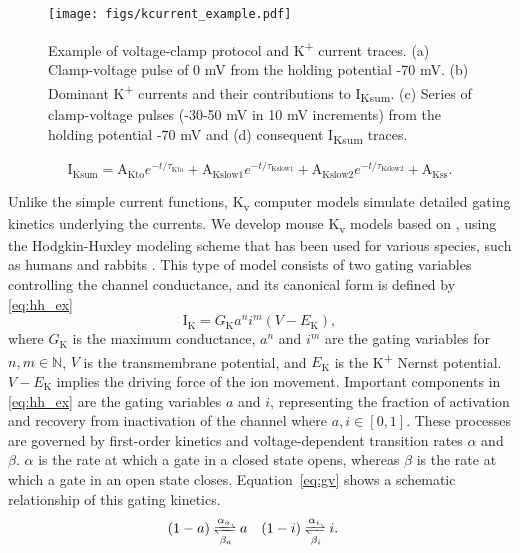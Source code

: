 \documentclass[11pt]{article}
\begin{document}
\begin{figure}[!ht]
    \centering
    \texttt{[image: figs/kcurrent\_example.pdf]}
    \caption{Example of voltage-clamp protocol and K\textsuperscript{+} current traces. (a) Clamp-voltage pulse of 0 mV from the holding potential -70 mV. (b) Dominant K\textsuperscript{+} currents and their contributions to I\textsubscript{Ksum}. (c) Series of clamp-voltage pulses (-30-50 mV in 10 mV increments) from the holding potential -70 mV and (d) consequent I\textsubscript{Ksum} traces.}
    \label{fig:kcurrent_example}
\end{figure}
\begin{equation}
    \label{eq:expl_fitting}
    \mathrm{I}_{\mathrm{Ksum}} = \mathrm{A}_{\mathrm{Kto}}e^{-t/\tau_{\mathrm{Kto}}} + \mathrm{A}_{\mathrm{Kslow1}}e^{-t/\tau_{\mathrm{Kslow1}}} + \mathrm{A}_{\mathrm{Kslow2}}e^{-t/\tau_{\mathrm{Kslow2}}} +  \mathrm{A}_{\mathrm{Kss}}.   
\end{equation}

Unlike the simple current functions, K\textsubscript{v} computer models simulate detailed gating kinetics underlying the currents. We develop mouse K\textsubscript{v} models based on \citep{bondarenko2014compartmentalized,asfaw2020compartmentalized}, using the Hodgkin-Huxley modeling scheme that has been used for various species, such as humans \citep{ten2004model} and rabbits \citep{mahajan2008rabbit}. This type of model consists of two gating variables controlling the channel conductance, and its canonical form is defined by \eqref{eq:hh_ex}
\begin{equation}
    \label{eq:hh_ex}
    \mathrm{I}_{\mathrm{K}} = G_{\mathrm{K}}a^{n}i^{m}(V-E_{\mathrm{K}}),
\end{equation}
where $G_{\mathrm{K}}$ is the maximum conductance, $a^{n}$ and $i^{m}$ are the gating variables for $n,m \in \mathbb{N}$, $V$ is the transmembrane potential, and $E_{\mathrm{K}}$ is the K\textsuperscript{+} Nernst potential. $V-E_{\mathrm{K}}$ implies the driving force of the ion movement. Important components in \eqref{eq:hh_ex} are the gating variables $a$ and $i$, representing the fraction of activation and recovery from inactivation of the channel where $a,i \in [0,1]$. These processes are governed by first-order kinetics and voltage-dependent transition rates $\alpha$ and $\beta$. $\alpha$ is the rate at which a gate in a closed state opens, whereas $\beta$ is the rate at which a gate in an open state closes. Equation~\eqref{eq:gv} shows a schematic relationship of this gating kinetics.
\begin{align}
    \label{eq:gv}
    (1-a)&\xrightleftharpoons[\beta_{a}]{\alpha_{a}}a & (1-i)&\xrightleftharpoons[\beta_{i}]{\alpha_{i}}i.
\end{align}
\end{document}
